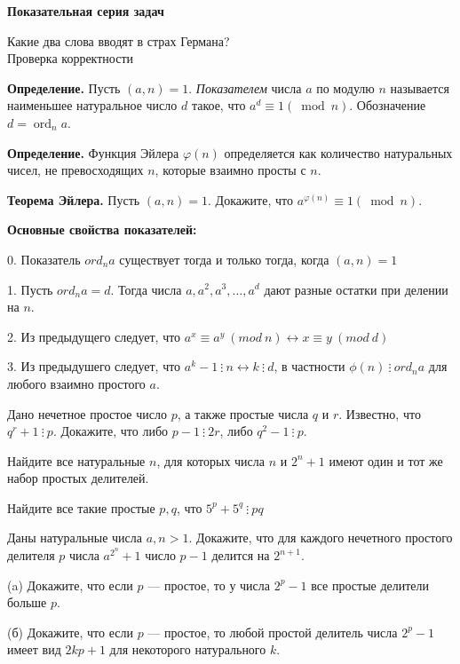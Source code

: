 \centerline{\bf \Huge Показательная серия задач}

\begin{flushright}
        \scriptsize{Какие два слова вводят в страх Германа?\\ Проверка корректности}
\end{flushright}

\textbf{Определение.} Пусть $(a, n)=1$. \textit{Показателем} числа $a$ по модулю $n$ называется наименьшее натуральное число $d$ такое, что $a^d \equiv 1(\bmod n)$. Обозначение $d=\operatorname{ord}_n a$.

\textbf{Определение.} Функция Эйлера $\varphi(n)$ определяется как количество натуральных чисел, не превосходящих $n$, которые взаимно просты с $n$.

\textbf{Теорема Эйлера.} Пусть $(a, n)=1$. Докажите, что $a^{\varphi(n)} \equiv 1(\bmod n)$.

\textbf{Основные свойства показателей:}

0. Показатель $ord_na$ существует тогда и только тогда, когда $(a,n) = 1$

1. Пусть $ord_n a = d$. Тогда числа $a, a^2, a^3, \ldots, a^d$ дают разные остатки при делении на $n$.

2. Из предыдущего следует, что $a^x \equiv a^y \ (mod \ n) \longleftrightarrow x \equiv y \ (mod \ d)$

3. Из предыдушего следует, что $a^k - 1 \ \vdots \ n \longleftrightarrow k \ \vdots \ d$, в частности $\phi(n) \ \vdots \ ord_na$ для любого взаимно простого $a$.

Дано нечетное простое число $p$, а также простые числа $q$ и $r$. Известно, что $q^r+1 \ \vdots \  p$. Докажите, что либо $p-1 \ \vdots \ 2 r$, либо $q^2-1 \ \vdots \ p$.

Найдите все натуральные $n$, для которых числа $n$ и $2^n + 1$ имеют один и тот же набор простых делителей.

Найдите все такие простые $p,q$, что $5^p + 5^q \ \vdots \ pq$

Даны натуральные числа $a, n>1$. Докажите, что для каждого нечетного простого делителя $p$ числа $a^{2^n}+1$ число $p-1$ делится на $2^{n+1}$.

(a) Докажите, что если $p$ --- простое, то у числа $2^p-1$ все простые делители больше $p$.

\noindent(б) Докажите, что если $p$ --- простое, то любой простой делитель числа $2^p-1$ имеет вид $2kp+1$ для некоторого натурального $k$.

